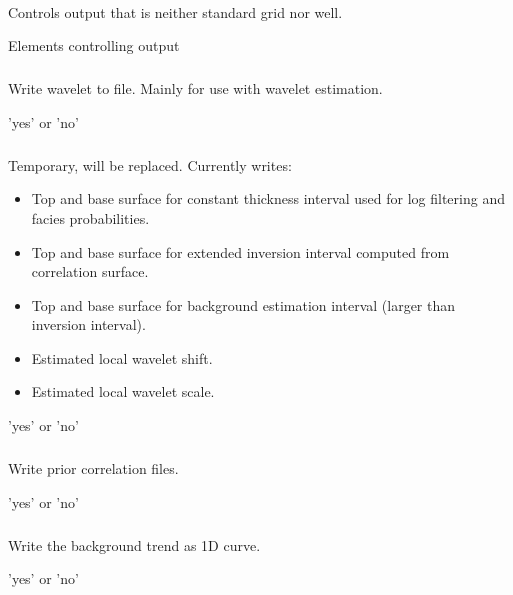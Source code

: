 \paragraph{}
 \slist
   \item \Description Controls output that is neither standard grid nor well.
   \item \Argument Elements controlling output
   \item \Default
 \elist

\subparagraph{}
 \slist
   \item \Description Write wavelet to file. Mainly for use with wavelet estimation.
   \item \Argument 'yes' or 'no'
   \item \Default
 \elist

\subparagraph{}
 \slist
   \item \Description Temporary, will be replaced. Currently writes:
   \begin{itemize}
   \item Top and base surface for constant thickness interval used for log filtering and facies probabilities.
   \item Top and base surface for extended inversion interval computed from correlation surface.
   \item Top and base surface for background estimation interval (larger than inversion interval).
   \item Estimated local wavelet shift.
   \item Estimated local wavelet scale.
   \end{itemize}
   \item \Argument 'yes' or 'no'
   \item \Default
 \elist

\subparagraph{}
 \slist
   \item \Description Write prior correlation files.
   \item \Argument 'yes' or 'no'
   \item \Default
 \elist

\subparagraph{}
 \slist
   \item \Description Write the background trend as 1D curve.
   \item \Argument 'yes' or 'no'
   \item \Default
 \elist

